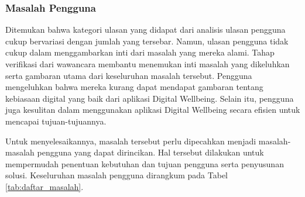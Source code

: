 \subsubsection{Masalah Pengguna}
\label{subsubsec:masalah_pengguna}

Ditemukan bahwa kategori ulasan yang didapat dari analisis ulasan pengguna cukup bervariasi dengan jumlah yang tersebar. Namun, ulasan pengguna tidak cukup dalam menggambarkan inti dari masalah yang mereka alami. Tahap verifikasi dari wawancara membantu menemukan inti masalah yang dikeluhkan serta gambaran utama dari keseluruhan masalah tersebut. Pengguna mengeluhkan bahwa mereka kurang dapat mendapat gambaran tentang kebiasaan digital yang baik dari aplikasi Digital Wellbeing. Selain itu, pengguna juga kesulitan dalam menggunakan aplikasi Digital Wellbeing secara efisien untuk mencapai tujuan-tujuannya.

Untuk menyelesaikannya, masalah tersebut perlu dipecahkan menjadi masalah-masalah pengguna yang dapat dirincikan. Hal tersebut dilakukan untuk mempermudah penentuan kebutuhan dan tujuan pengguna serta penyusunan solusi. Keseluruhan masalah pengguna dirangkum pada Tabel \ref{tab:daftar_masalah}.

